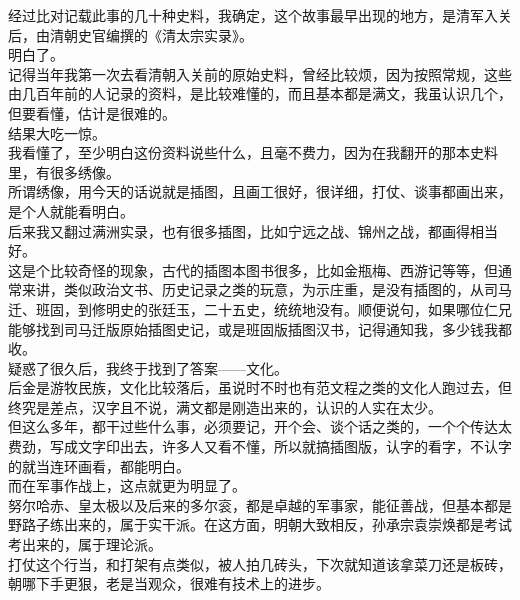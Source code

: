 \begin{multicols}{\theparacolNo}
经过比对记载此事的几十种史料，我确定，这个故事最早出现的地方，是清军入关后，由清朝史官编撰的《清太宗实录》。\\

明白了。\\

记得当年我第一次去看清朝入关前的原始史料，曾经比较烦，因为按照常规，这些由几百年前的人记录的资料，是比较难懂的，而且基本都是满文，我虽认识几个，但要看懂，估计是很难的。\\

结果大吃一惊。\\

我看懂了，至少明白这份资料说些什么，且毫不费力，因为在我翻开的那本史料里，有很多绣像。\\

所谓绣像，用今天的话说就是插图，且画工很好，很详细，打仗、谈事都画出来，是个人就能看明白。\\

后来我又翻过满洲实录，也有很多插图，比如宁远之战、锦州之战，都画得相当好。\\

这是个比较奇怪的现象，古代的插图本图书很多，比如金瓶梅、西游记等等，但通常来讲，类似政治文书、历史记录之类的玩意，为示庄重，是没有插图的，从司马迁、班固，到修明史的张廷玉，二十五史，统统地没有。顺便说句，如果哪位仁兄能够找到司马迁版原始插图史记，或是班固版插图汉书，记得通知我，多少钱我都收。\\

疑惑了很久后，我终于找到了答案——文化。\\

后金是游牧民族，文化比较落后，虽说时不时也有范文程之类的文化人跑过去，但终究是差点，汉字且不说，满文都是刚造出来的，认识的人实在太少。\\

但这么多年，都干过些什么事，必须要记，开个会、谈个话之类的，一个个传达太费劲，写成文字印出去，许多人又看不懂，所以就搞插图版，认字的看字，不认字的就当连环画看，都能明白。\\

而在军事作战上，这点就更为明显了。\\

努尔哈赤、皇太极以及后来的多尔衮，都是卓越的军事家，能征善战，但基本都是野路子练出来的，属于实干派。在这方面，明朝大致相反，孙承宗袁崇焕都是考试考出来的，属于理论派。\\

打仗这个行当，和打架有点类似，被人拍几砖头，下次就知道该拿菜刀还是板砖，朝哪下手更狠，老是当观众，很难有技术上的进步。\\


\end{multicols}
